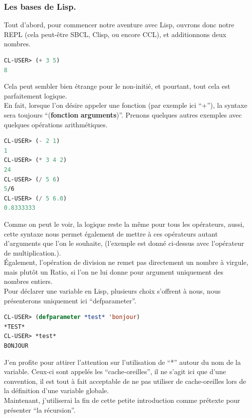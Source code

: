 \documentclass[a4paper, 12pt]{article}
\numberwithin{equation}{subsection}
\begin{document}
\subsubsection{Les bases de Lisp.}
Tout d'abord, pour commencer notre aventure avec Lisp, ouvrons donc notre REPL (cela peut-être SBCL, Clisp, ou encore CCL), et additionnons deux nombres. \\
\begin{lstlisting}[language=Lisp]
CL-USER> (+ 3 5)
8
\end{lstlisting}
Cela peut sembler bien étrange pour le non-initié, et pourtant, tout cela est parfaitement logique. \\

En fait, lorsque l'on désire appeler une fonction (par exemple ici ``+''), la syntaxe sera toujours ``({\bf fonction} {\bf arguments})''. Prenons quelques autres exemples avec quelques opérations arithmétiques. \\
\begin{lstlisting}[language=Lisp]
CL-USER> (- 2 1)
1
CL-USER> (* 3 4 2)
24
CL-USER> (/ 5 6)
5/6
CL-USER> (/ 5 6.0)
0.8333333
\end{lstlisting}
Comme on peut le voir, la logique reste la même pour tous les opérateurs, aussi, cette syntaxe nous permet également de mettre à ces opérateurs autant d'arguments que l'on le souhaite, (l'exemple est donné ci-dessus avec l'opérateur de multiplication.). \\

Également, l'opération de division ne remet pas directement un nombre à virgule, mais plutôt un Ratio, si l'on ne lui donne pour argument uniquement des nombres entiers. \\

Pour déclarer une variable en Lisp, plusieurs choix s'offrent à nous, nous présenterons uniquement ici ``defparameter''.
\begin{lstlisting}[language=Lisp]
CL-USER> (defparameter *test* 'bonjour)
*TEST*
CL-USER> *test*
BONJOUR
\end{lstlisting}
J'en profite pour attirer l'attention sur l'utilisation de ``*'' autour du nom de la variable. Ceux-ci sont appelés les ``cache-oreilles'', il ne s'agit ici que d'une convention, il est tout à fait acceptable de ne pas utiliser de cache-oreilles lors de la définition d'une variable globale. \\

Maintenant, j'utiliserai la fin de cette petite introduction comme prétexte pour présenter ``la récursion''. \\
\end{document}
